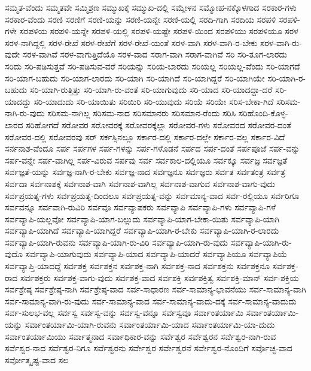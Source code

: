{ಸಮ್ಮತ-ವೆಂದು
ಸಮ್ಮತವೇ
ಸಮ್ಮಿಶ್ರಣ
ಸಮ್ಮುಖಕ್ಕೆ
ಸಮ್ಮುಖ-ದಲ್ಲಿ
ಸಮ್ಮೇಳನ
ಸಮ್ಮೋಹ-ನಕ್ಕೊಳಗಾದ
ಸರಕಾರ-ಗಳು
ಸರಕಾರ-ವೆಂದು
ಸರಣಿ
ಸರಣಿಗೆ
ಸರಣಿ-ಯನ್ನು
ಸರಣಿ-ಯನ್ನೇ
ಸರಣಿ-ಯಲ್ಲಿ
ಸರದಿ-ಗಾಗಿ
ಸರದಿಯ
ಸರಪಳಿ
ಸರಪಳಿ-ಗಳೇ
ಸರಪಳಿಯ
ಸರಪಳಿ-ಯನ್ನೇ
ಸರಪಳಿ-ಯಲ್ಲಿ
ಸರಪಳಿ-ಯಷ್ಟೇ
ಸರಪಳಿ-ಯಿಂದ
ಸರಪಳಿಯು
ಸರಪಳಿಯೂ
ಸರಳ
ಸರಳ-ನಾಗಿದ್ದಲ್ಲಿ
ಸರಳ-ರೇಖೆ
ಸರಳ-ರೇಖೆಗೆ
ಸರಳ-ರೇಖೆ-ಯಂತೆ
ಸರಳ-ವಾಗಿ
ಸರಳ-ವಾಗಿ-ರ-ಬೇಕು
ಸರಳ-ವಾಗಿ-ರು-ವುದೇ
ಸರಳ-ವಾಗಿವೆ
ಸರಳ-ವಾಗುತ್ತಿದೆಯೊ
ಸರಳ-ವಾದ
ಸರಾಗ-ವಾಗಿ
ಸರಾಗ-ವಾಗಿವೆ
ಸರಿ
ಸರಿ-ತೂಗ-ಲಾರದು
ಸರಿದು
ಸರಿ-ಪಡಿಸುತ್ತವೆ
ಸರಿ-ಪಡಿಸುವ-ವರೆ
ಸರಿಯನ್ನು
ಸರಿಯ-ಬಾರದು
ಸರಿಯಲ್ಲ
ಸರಿಯಲ್ಲ-ವೆಂದು
ಸರಿ-ಯಾಗದೆ
ಸರಿ-ಯಾಗ-ಬಹುದು
ಸರಿ-ಯಾಗ-ಲಾರದು
ಸರಿ-ಯಾಗಿ
ಸರಿ-ಯಾಗಿದೆ
ಸರಿ-ಯಾಗಿದ್ದರೆ
ಸರಿ-ಯಾಗಿಯೇ
ಸರಿ-ಯಾಗಿ-ರ-ಬಹುದು
ಸರಿ-ಯಾಗಿ-ರುತ್ತಿತ್ತು
ಸರಿ-ಯಾಗಿ-ರು-ವಂತೆ
ಸರಿ-ಯಾಗುವುದು
ಸರಿ-ಯಾದ
ಸರಿ-ಯಾದದ್ದಾ-ದರೆ
ಸರಿ-ಯಾದದ್ದು
ಸರಿ-ಯಾದುದು
ಸರಿ-ಯಾಯಿತು
ಸರಿಯಿರಿ
ಸರಿ-ಯುವುದು
ಸರಿಯೆ
ಸರಿಯೇ
ಸರಿಸ-ಬೇಕಾ-ಗಿದೆ
ಸರಿಸಮ-ನಾಗಿ-ರು-ವುದು
ಸರಿಸಮ-ನಾಗಿಲ್ಲ
ಸರಿಸಮ-ನಾದ
ಸರಿಸಮಾನರು
ಸರಿಸಮಾನ-ರೆಂದು
ಸರಿಸಿ
ಸರಿಹೊಂದಿ-ಕೊಳ್ಳ-ಲಾರದ
ಸರಿಹೋಗದೆ
ಸರೋವರ
ಸರೋವರಕ್ಕೆ
ಸರೋವರಕ್ಕೆಲ್ಲಾ
ಸರೋವರ-ಗಳು
ಸರೋವರದ
ಸರೋವರ-ದಂತೆ
ಸರೋವರ-ದಲ್ಲಿ
ಸರೋವರವು
ಸರ್
ಸರ್ಕಸ್ಸಿನಲ್ಲೂ
ಸರ್ಕಾರ-ದಲ್ಲಿ
ಸರ್ಕಾರ-ದಲ್ಲೇ
ಸರ್ಕಾರ-ವಲ್ಲ
ಸರ್ಕಾರ-ವಿದೆ
ಸರ್ನನಾಶ-ವೆಂದೂ
ಸರ್ಪ
ಸರ್ಪಗಳ
ಸರ್ಪ-ಗಳನ್ನು
ಸರ್ಪ-ಗಳೊಡನೆ
ಸರ್ಪದ
ಸರ್ಪ-ದಂತೆ
ಸರ್ಪಪೂಜೆ
ಸರ್ಪ-ವನ್ನು
ಸರ್ಪ-ವನ್ನೇ
ಸರ್ಪ-ವಾಗಿಲ್ಲ
ಸರ್ಪ-ವಿರುವ
ಸರ್ಪವು
ಸರ್ವ
ಸರ್ವಕಾಲ-ದಲ್ಲಿಯೂ
ಸರ್ವಕ್ಕೂ
ಸರ್ವಜ್ಞ
ಸರ್ವಜ್ಞತೆ
ಸರ್ವಜ್ಞತೆ-ಯನ್ನು
ಸರ್ವಜ್ಞ-ನಾಗಿ-ರ-ಬೇಕು
ಸರ್ವಜ್ಞ-ನಾದ
ಸರ್ವಜ್ಞನೂ
ಸರ್ವಜ್ಞರು
ಸರ್ವತ
ಸರ್ವತಂತ್ರ
ಸರ್ವತ್ರ
ಸರ್ವದಾ
ಸರ್ವನಾಶಕ್ಕೆ
ಸರ್ವನಾಶ-ವಾಗಿ
ಸರ್ವನಾಶ-ವಾಗಿಲ್ಲ
ಸರ್ವನಾಶ-ವಾಗುವ
ಸರ್ವನಾಶ-ವಾಗು-ವುದು
ಸರ್ವಪ್ರಯತ್ನ-ಗಳು
ಸರ್ವಪ್ರಯತ್ನ-ದಿಂದಲೂ
ಸರ್ವಪ್ರಯತ್ನ-ವನ್ನು
ಸರ್ವಮಾನ್ಯ-ವಾದ
ಸರ್ವ-ರಲ್ಲಿಯೂ
ಸರ್ವರಿಗೂ
ಸರ್ವವನ್ನೂ
ಸರ್ವವಾಗಿ-ರುವಿರಿ
ಸರ್ವವೂ
ಸರ್ವವ್ಯಾಪಕರು
ಸರ್ವವ್ಯಾಪಿ
ಸರ್ವವ್ಯಾಪಿ-ಗಳು
ಸರ್ವವ್ಯಾಪಿ-ಗಳೆ
ಸರ್ವವ್ಯಾಪಿ-ಯಲ್ಲವೋ
ಸರ್ವವ್ಯಾಪಿ-ಯಾಗ-ಬಲ್ಲುದು
ಸರ್ವವ್ಯಾಪಿ-ಯಾಗ-ಬೇಕಾ-ಯಿತು
ಸರ್ವವ್ಯಾಪಿ-ಯಾಗಿ
ಸರ್ವವ್ಯಾಪಿ-ಯಾಗಿದೆ
ಸರ್ವವ್ಯಾಪಿ-ಯಾಗಿದ್ದರೆ
ಸರ್ವವ್ಯಾಪಿ-ಯಾಗಿ-ರ-ಬೇಕು
ಸರ್ವವ್ಯಾಪಿ-ಯಾಗಿ-ರ-ಲಾರದು
ಸರ್ವವ್ಯಾಪಿ-ಯಾಗಿ-ರುವನು
ಸರ್ವವ್ಯಾಪಿ-ಯಾಗಿ-ರು-ವಿರಿ
ಸರ್ವವ್ಯಾಪಿ-ಯಾಗಿ-ರು-ವುದು
ಸರ್ವವ್ಯಾಪಿ-ಯಾಗಿ-ರು-ವುದೊ
ಸರ್ವವ್ಯಾಪಿ-ಯಾಗುವುದು
ಸರ್ವವ್ಯಾಪಿ-ಯಾದ
ಸರ್ವವ್ಯಾಪಿ-ಯಾದರೆ
ಸರ್ವವ್ಯಾಪಿಯೂ
ಸರ್ವವ್ಯಾಪಿಯೆ
ಸರ್ವವ್ಯಾಪ್ತಿ-ಯಾದದ್ದೆ
ಸರ್ವಶಕ್ತ
ಸರ್ವಶಕ್ತನ
ಸರ್ವಶಕ್ತ-ನಾಗಿ
ಸರ್ವಶಕ್ತ-ನಾದ
ಸರ್ವಶಕ್ತನು
ಸರ್ವಶಕ್ತನೂ
ಸರ್ವಶಕ್ತ-ರಾದ
ಸರ್ವಶಕ್ತರು
ಸರ್ವಶಕ್ತ-ವಾಗು-ವುದು
ಸರ್ವಶಕ್ತ-ವಾದ
ಸರ್ವಶಕ್ತಿ
ಸರ್ವಶಕ್ತಿತ್ವ
ಸರ್ವಶಕ್ತಿ-ಮಾನ್
ಸರ್ವ-ಶಕ್ತಿಯ
ಸರ್ವಶ್ರೇಷ್ಠ
ಸರ್ವಶ್ರೇಷ್ಠ-ನಾಗಿ
ಸರ್ವಶ್ರೇಷ್ಠ-ವಾದ
ಸರ್ವ-ಸಾಧಾರಣ
ಸರ್ವ-ಸಾಮಾನ್ಯ-ಭಾವನೆಯು
ಸರ್ವ-ಸಾಮಾನ್ಯ-ವಾಗಿ
ಸರ್ವ-ಸಾಮಾನ್ಯ-ವಾಗಿ-ರು-ವುದು
ಸರ್ವ-ಸಾಮಾನ್ಯ-ವಾದ
ಸರ್ವ-ಸಾಮಾನ್ಯ-ವಾದು-ದಕ್ಕೆ
ಸರ್ವ-ಸಾಮಾನ್ಯ-ವಾದುದು
ಸರ್ವ-ಸುಲಭ-ವಲ್ಲ
ಸರ್ವಸ್ವ
ಸರ್ವಸ್ವ-ವನ್ನು
ಸರ್ವಸ್ವ-ವನ್ನೂ
ಸರ್ವಸ್ವವೂ
ಸರ್ವಾಂತರ್ಯಾಮಿ
ಸರ್ವಾಂತರ್ಯಾಮಿ-ಯನ್ನು
ಸರ್ವಾಂತರ್ಯಾಮಿ-ಯಾಗಿ-ರುವನು
ಸರ್ವಾಂತರ್ಯಾಮಿ-ಯಾದ
ಸರ್ವಾಂತರ್ಯಾಮಿ-ಯಾ-ದುದು
ಸರ್ವಾಂತರ್ಯಾಮಿಯು
ಸರ್ವಾತ್ಮನಾದ
ಸರ್ವಾಧಿಕಾರ-ವನ್ನು
ಸರ್ವೆಶ್ವರ
ಸರ್ವೆಶ್ವರನ
ಸರ್ವೆಶ್ವರ-ನಾಗಿ-ರುವ
ಸರ್ವೆಶ್ವರ-ನಾದ
ಸರ್ವೆಶ್ವರ-ನಿಗೂ
ಸರ್ವೆಶ್ವರನು
ಸರ್ವೇಶ್ವರ
ಸರ್ವೇಶ್ವರನೆ
ಸರ್ವೇಶ್ವರ-ನೊಂದಿಗೆ
ಸರ್ವೊಚ್ಛ-ವಾದ
ಸರ್ವೋತ್ಕೃಷ್ಟ-ವಾದ
ಸಲ
}
